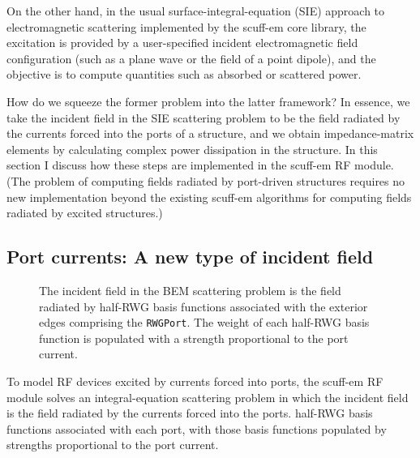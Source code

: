 \documentclass[letterpaper]{article}
\begin{document}
On the other hand, in the usual surface-integral-equation (SIE)
approach to electromagnetic scattering implemented by the {\sc scuff-em}
core library, the excitation is provided by a user-specified
incident electromagnetic field configuration (such as a plane wave
or the field of a point dipole),
and the objective is to compute quantities such as absorbed or scattered
power.

How do we squeeze the former problem into the latter framework?
In essence, we take the incident field in the SIE scattering problem
to be the field radiated by the currents forced into the ports
of a structure, and we obtain impedance-matrix elements by calculating
complex power dissipation in the structure.
In this section I discuss how these steps are implemented
in the {\sc scuff-em} RF module.
(The problem of computing fields radiated by port-driven structures
requires no new implementation beyond the existing {\sc scuff-em} 
algorithms for computing fields radiated by excited structures.)

\subsection{Port currents: A new type of incident field}

\begin{figure}
\begin{center}
\caption{The incident field in the BEM scattering problem
         is the field radiated by half-RWG basis functions
         associated with the exterior edges comprising the
         \texttt{RWGPort}.
         The weight of each
half-RWG basis function is populated with
         a strength proportional to the port current.
        }
\label{PortCurrentFigure}
\end{center}
\end{figure}

To model RF devices excited by currents forced into ports,
the {\sc scuff-em} RF module solves an integral-equation scattering problem
in which the incident field is the field radiated by the currents
forced into the ports.
half-RWG basis
functions associated 
with each port, with those basis functions populated by strengths
proportional to the port current.
\end{document}
